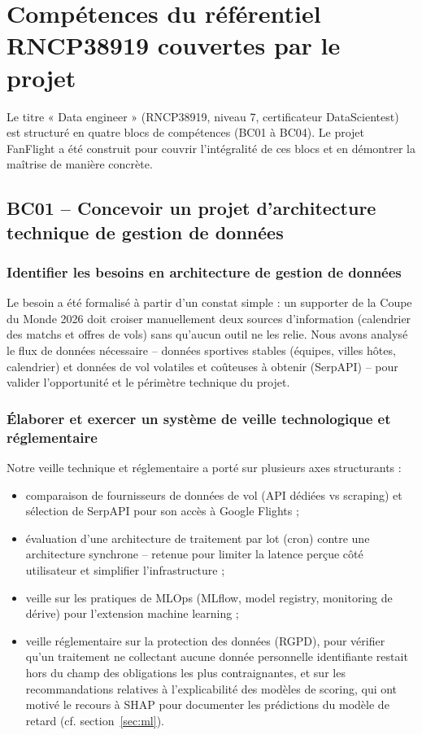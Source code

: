 \documentclass[11pt,a4paper]{report}
\begin{document}
\chapter{Compétences du référentiel RNCP38919 couvertes par le projet}

Le titre « Data engineer » (RNCP38919, niveau 7, certificateur DataScientest) est structuré en quatre blocs de compétences (BC01 à BC04). Le projet FanFlight a été construit pour couvrir l'intégralité de ces blocs et en démontrer la maîtrise de manière concrète.

\section{BC01 -- Concevoir un projet d'architecture technique de gestion de données}

\subsection{Identifier les besoins en architecture de gestion de données}

Le besoin a été formalisé à partir d'un constat simple : un supporter de la Coupe du Monde 2026 doit croiser manuellement deux sources d'information (calendrier des matchs et offres de vols) sans qu'aucun outil ne les relie. Nous avons analysé le flux de données nécessaire -- données sportives stables (équipes, villes hôtes, calendrier) et données de vol volatiles et coûteuses à obtenir (SerpAPI) -- pour valider l'opportunité et le périmètre technique du projet.

\subsection{Élaborer et exercer un système de veille technologique et réglementaire}

Notre veille technique et réglementaire a porté sur plusieurs axes structurants :
\begin{itemize}
  \item comparaison de fournisseurs de données de vol (API dédiées vs scraping) et sélection de SerpAPI pour son accès à Google Flights ;
  \item évaluation d'une architecture de traitement par lot (cron) contre une architecture synchrone -- retenue pour limiter la latence perçue côté utilisateur et simplifier l'infrastructure ;
  \item veille sur les pratiques de MLOps (MLflow, model registry, monitoring de dérive) pour l'extension machine learning ;
  \item veille réglementaire sur la protection des données (RGPD), pour vérifier qu'un traitement ne collectant aucune donnée personnelle identifiante restait hors du champ des obligations les plus contraignantes, et sur les recommandations relatives à l'explicabilité des modèles de scoring, qui ont motivé le recours à SHAP pour documenter les prédictions du modèle de retard (cf. section~\ref{sec:ml}).
\end{itemize}
\end{document}
